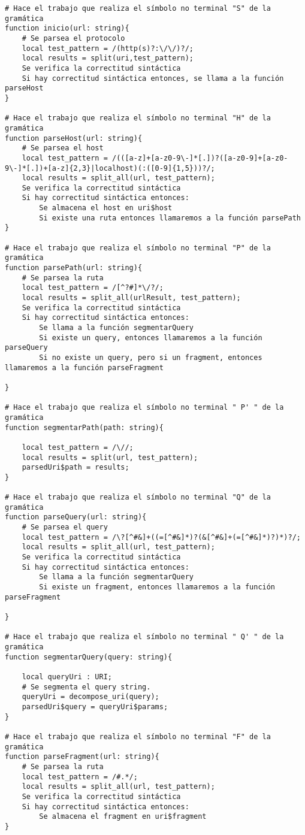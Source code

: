 \begin{verbatim}
# Hace el trabajo que realiza el símbolo no terminal "S" de la gramática
function inicio(url: string){
    # Se parsea el protocolo
    local test_pattern = /(http(s)?:\/\/)?/;
    local results = split(uri,test_pattern);
    Se verifica la correctitud sintáctica
    Si hay correctitud sintáctica entonces, se llama a la función parseHost
}

# Hace el trabajo que realiza el símbolo no terminal "H" de la gramática
function parseHost(url: string){
    # Se parsea el host
    local test_pattern = /(([a-z]+[a-z0-9\-]*[.])?([a-z0-9]+[a-z0-9\-]*[.])+[a-z]{2,3}|localhost)(:([0-9]{1,5}))?/;
    local results = split_all(url, test_pattern);
    Se verifica la correctitud sintáctica
    Si hay correctitud sintáctica entonces:
        Se almacena el host en uri$host
        Si existe una ruta entonces llamaremos a la función parsePath
}

# Hace el trabajo que realiza el símbolo no terminal "P" de la gramática
function parsePath(url: string){
    # Se parsea la ruta
    local test_pattern = /[^?#]*\/?/;
    local results = split_all(urlResult, test_pattern);
    Se verifica la correctitud sintáctica
    Si hay correctitud sintáctica entonces:
        Se llama a la función segmentarQuery
        Si existe un query, entonces llamaremos a la función parseQuery
        Si no existe un query, pero si un fragment, entonces llamaremos a la función parseFragment

}

# Hace el trabajo que realiza el símbolo no terminal " P' " de la gramática
function segmentarPath(path: string){

    local test_pattern = /\//;
    local results = split(url, test_pattern);
    parsedUri$path = results;
}

# Hace el trabajo que realiza el símbolo no terminal "Q" de la gramática
function parseQuery(url: string){
    # Se parsea el query
    local test_pattern = /\?[^#&]+((=[^#&]*)?(&[^#&]+(=[^#&]*)?)*)?/;
    local results = split_all(url, test_pattern);
    Se verifica la correctitud sintáctica
    Si hay correctitud sintáctica entonces:
        Se llama a la función segmentarQuery
        Si existe un fragment, entonces llamaremos a la función parseFragment

}

# Hace el trabajo que realiza el símbolo no terminal " Q' " de la gramática
function segmentarQuery(query: string){

    local queryUri : URI;
    # Se segmenta el query string.
    queryUri = decompose_uri(query);
    parsedUri$query = queryUri$params;
}

# Hace el trabajo que realiza el símbolo no terminal "F" de la gramática
function parseFragment(url: string){
    # Se parsea la ruta
    local test_pattern = /#.*/;
    local results = split_all(url, test_pattern);
    Se verifica la correctitud sintáctica
    Si hay correctitud sintáctica entonces:
        Se almacena el fragment en uri$fragment
}
\end{verbatim}

